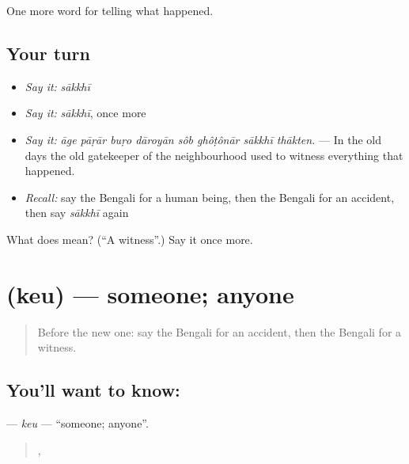 \begin{grammarlens}[title={What you've built}]
One more word for telling what happened.
\end{grammarlens}

\subsection*{Your turn}
\begin{itemize}
\raggedright
  \item \emph{Say it:} \emph{sākkhī}
  \item \emph{Say it:} \emph{sākkhī}, once more
  \item \emph{Say it:} \emph{āge pāṛār buṛo dāroyān sôb ghôṭônār sākkhī thākten.} — In the old days the old gatekeeper of the neighbourhood used to witness everything that happened.
  \item \emph{Recall:} say the Bengali for a human being, then the Bengali for an accident, then say \emph{sākkhī} again
\end{itemize}

\begin{tcolorbox}[breakable,colback=teal!4,colframe=teal!35!black,title={Before you move on}]
What does  mean? (\textquotedblleft{}A witness\textquotedblright{}.) Say it once more.
\end{tcolorbox}
\section[\texorpdfstring{\bn{কেউ} (keu)}{কেউ (keu)}]{ (keu) — someone; anyone}

\label{lesson:BN-C277-keu}



\begin{quote}
Before the new one: say the Bengali for an accident, then the Bengali for a witness.
\end{quote}

\subsection*{You'll want to know: }
\textbf{} — \emph{keu} — \textquotedblleft{}someone; anyone\textquotedblright{}.

\begin{quote}
  ,      
\end{quote}

